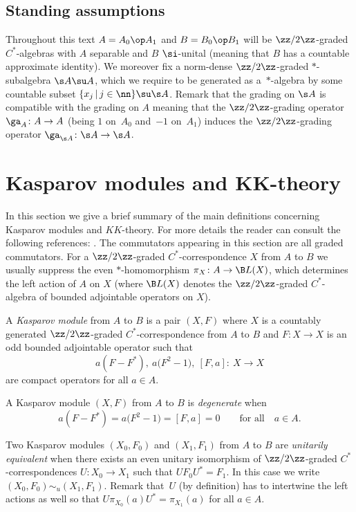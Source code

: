 \subsection{Standing assumptions} Throughout this text $A = A_0 \op A_1$ and $B = B_0 \op B_1$ will be $\zz/2\zz$-graded $C^*$-algebras with $A$ separable and $B$ $\si$-unital (meaning that $B$ has a countable approximate identity). We moreover fix a norm-dense $\zz/2\zz$-graded $*$-subalgebra $\s A \su A$, which we require to be generated as a~$*$-algebra by some countable subset $\{ x_j \,|\, j \in \nn \} \su \s A$. Remark that the grading on $\s A$ is compatible with the grading on $A$ meaning that the $\zz/2\zz$-grading operator $\ga_A \colon A \to A$ (being $1$ on~$A_0$ and~$-1$ on~$A_1$) induces the $\zz/2\zz$-grading operator $\ga_{\s A} \colon \s A \to \s A$.

\section[Kasparov modules and $KK$-theory]{Kasparov modules and $\boldsymbol{KK}$-theory}\label{s:boukas}
In this section we give a brief summary of the main definitions concerning Kasparov modules and $KK$-theory. For more details the reader can consult the following references: \cite{Bla:KOA,JeTh:EKT, Kas:OFE}. The commutators appearing in this section are all graded commutators. For a $\zz/2\zz$-graded $C^*$-correspondence $X$ from $A$ to $B$ we usually suppress the even $*$-homomorphism $\pi_X\colon A \to \B L(X)$, which determines the left action of $A$ on $X$ (where $\B L(X)$ denotes the $\zz/2\zz$-graded $C^*$-algebra of bounded adjointable operators on $X$).

\begin{dfn}
A \emph{Kasparov module} from $A$ to $B$ is a pair $(X,F)$ where $X$ is a countably generated $\zz/2\zz$-graded $C^*$-correspondence from $A$ to $B$ and $F\colon X \to X$ is an odd bounded adjointable operator such that
\[
a (F - F^*) , \ a \big(F^2 - 1\big) , \ [F,a] \colon \ X \to X
\]
are compact operators for all $a \in A$.

A Kasparov module $(X,F)$ from $A$ to $B$ is \emph{degenerate} when
\[
a (F - F^*) = a \big(F^2 - 1\big) = [F,a] = 0 \qquad \mbox{for all} \quad a \in A .
\]
\end{dfn}

\begin{dfn}Two Kasparov modules $(X_0,F_0)$ and $(X_1,F_1)$ from $A$ to $B$ are \emph{unitarily equivalent} when there exists an even unitary isomorphism of $\zz/2\zz$-graded $C^*$-correspondences $U\colon X_0 \to X_1$ such that $U F_0 U^* = F_1$. In this case we write $(X_0,F_0) \sim_u (X_1,F_1)$. Remark that~$U$ (by definition) has to intertwine the left actions as well so that $U \pi_{X_0}(a) U^* = \pi_{X_1}(a)$ for all $a \in A$.
\end{dfn}

